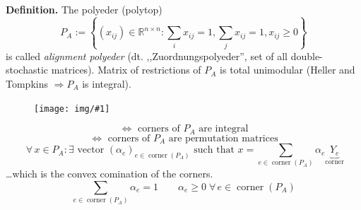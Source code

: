 \documentclass{article}
\newcommand{\drawing}[1]{%
 \begin{figure}[t]
  \begin{center}
   \texttt{[image: img/\#1]}
  \end{center}
 \end{figure}
}
\newcommand{\set}[1]{\left\{#1\right\}}
\newcommand{\fall}{\;\forall\,}
\begin{document}
\textbf{Definition.}
  The polyeder (polytop)
  \[ P_A := \set{(x_{ij}) \in \mathbb{R}^{n\times n}: \sum_i x_{ij} = 1, \sum_j x_{ij} = 1, x_{ij} \geq 0} \]
  is called \emph{alignment polyeder} (dt. ,,Zuordnungspolyeder'', set of all double-stochastic matrices).
  Matrix of restrictions of $P_A$ is total unimodular (Heller and Tompkins $\Rightarrow P_A$ is integral).
  \drawing{assignment_polyeder.pdf}
  \[ \Leftrightarrow \text{ corners of } P_A \text{ are integral} \]
  \[ \Leftrightarrow \text{ corners of } P_A \text{ are permutation matrices} \]
  \[ \fall x \in P_A: \exists \text{ vector } (\alpha_e)_{e \in \operatorname{corner}(P_A)} \text{ such that } x = \sum_{e \in \operatorname{corner}(P_A)} \alpha_e \underbrace{Y_e}_{\operatorname{corner}} \]
  \dots which is the convex comination of the corners.
  \[ \sum_{e\in\operatorname{corner}(P_A)} \alpha_e = 1 \qquad \alpha_e \geq 0 \fall e \in \operatorname{corner}(P_A) \]
\end{document}

